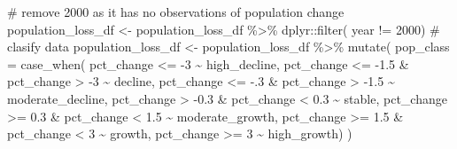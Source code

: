 \documentclass[
  letterpaper,
  DIV=11,
  numbers=noendperiod]{scrreprt}
\newenvironment{Shaded}{\begin{snugshade}}{\end{snugshade}}
\newcommand{\AttributeTok}[1]{\textcolor[rgb]{0.40,0.45,0.13}{#1}}
\newcommand{\CommentTok}[1]{\textcolor[rgb]{0.37,0.37,0.37}{#1}}
\newcommand{\DecValTok}[1]{\textcolor[rgb]{0.68,0.00,0.00}{#1}}
\newcommand{\FloatTok}[1]{\textcolor[rgb]{0.68,0.00,0.00}{#1}}
\newcommand{\FunctionTok}[1]{\textcolor[rgb]{0.28,0.35,0.67}{#1}}
\newcommand{\NormalTok}[1]{\textcolor[rgb]{0.00,0.23,0.31}{#1}}
\newcommand{\OtherTok}[1]{\textcolor[rgb]{0.00,0.23,0.31}{#1}}
\newcommand{\SpecialCharTok}[1]{\textcolor[rgb]{0.37,0.37,0.37}{#1}}
\newcommand{\StringTok}[1]{\textcolor[rgb]{0.13,0.47,0.30}{#1}}
\begin{document}
\begin{Shaded}
\begin{Highlighting}[]
\CommentTok{\# remove 2000 as it has no observations of population change}
\NormalTok{population\_loss\_df }\OtherTok{\textless{}{-}}\NormalTok{ population\_loss\_df }\SpecialCharTok{\%\textgreater{}\%} 
\NormalTok{  dplyr}\SpecialCharTok{::}\FunctionTok{filter}\NormalTok{( year }\SpecialCharTok{!=} \DecValTok{2000}\NormalTok{)}
\CommentTok{\# clasify data}
\NormalTok{population\_loss\_df }\OtherTok{\textless{}{-}}\NormalTok{ population\_loss\_df }\SpecialCharTok{\%\textgreater{}\%}
  \FunctionTok{mutate}\NormalTok{(}
    \AttributeTok{pop\_class =} \FunctionTok{case\_when}\NormalTok{( pct\_change }\SpecialCharTok{\textless{}=} \SpecialCharTok{{-}}\DecValTok{3} \SpecialCharTok{\textasciitilde{}} \StringTok{\textquotesingle{}high\_decline\textquotesingle{}}\NormalTok{,}
\NormalTok{                           pct\_change }\SpecialCharTok{\textless{}=} \SpecialCharTok{{-}}\FloatTok{1.5} \SpecialCharTok{\&}\NormalTok{ pct\_change }\SpecialCharTok{\textgreater{}} \SpecialCharTok{{-}}\DecValTok{3} \SpecialCharTok{\textasciitilde{}} \StringTok{\textquotesingle{}decline\textquotesingle{}}\NormalTok{,}
\NormalTok{                           pct\_change }\SpecialCharTok{\textless{}=} \SpecialCharTok{{-}}\NormalTok{.}\DecValTok{3} \SpecialCharTok{\&}\NormalTok{ pct\_change }\SpecialCharTok{\textgreater{}} \SpecialCharTok{{-}}\FloatTok{1.5} \SpecialCharTok{\textasciitilde{}} \StringTok{\textquotesingle{}moderate\_decline\textquotesingle{}}\NormalTok{,}
\NormalTok{                           pct\_change }\SpecialCharTok{\textgreater{}} \SpecialCharTok{{-}}\FloatTok{0.3} \SpecialCharTok{\&}\NormalTok{ pct\_change }\SpecialCharTok{\textless{}} \FloatTok{0.3} \SpecialCharTok{\textasciitilde{}} \StringTok{\textquotesingle{}stable\textquotesingle{}}\NormalTok{,}
\NormalTok{                           pct\_change }\SpecialCharTok{\textgreater{}=} \FloatTok{0.3} \SpecialCharTok{\&}\NormalTok{ pct\_change }\SpecialCharTok{\textless{}} \FloatTok{1.5} \SpecialCharTok{\textasciitilde{}} \StringTok{\textquotesingle{}moderate\_growth\textquotesingle{}}\NormalTok{,}
\NormalTok{                           pct\_change }\SpecialCharTok{\textgreater{}=} \FloatTok{1.5} \SpecialCharTok{\&}\NormalTok{ pct\_change }\SpecialCharTok{\textless{}} \DecValTok{3} \SpecialCharTok{\textasciitilde{}} \StringTok{\textquotesingle{}growth\textquotesingle{}}\NormalTok{,}
\NormalTok{                           pct\_change }\SpecialCharTok{\textgreater{}=} \DecValTok{3} \SpecialCharTok{\textasciitilde{}} \StringTok{\textquotesingle{}high\_growth\textquotesingle{}}\NormalTok{)}
\NormalTok{)}
\end{Highlighting}
\end{Shaded}
\end{document}
